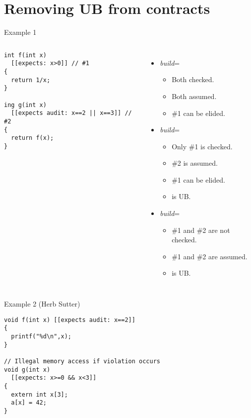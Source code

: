 \section{Removing UB from contracts}

\begin{frame}[t,fragile]{Example 1}
\vspace{-1em}
\begin{columns}[T]

\begin{block}{}
\begin{lstlisting}
int f(int x) 
  [[expects: x>0]] // #1
{
  return 1/x;
}

ing g(int x) 
  [[expects audit: x==2 || x==3]] // #2
{
  return f(x);
}
\end{lstlisting}
\end{block}

\begin{itemize}
  \item \emph{build}=
    \begin{itemize}
      \item Both checked.
      \item Both assumed.
      \item \#1 can be elided.
    \end{itemize}
  \pause\vfill
  \item \emph{build}=
    \begin{itemize}
      \item Only \#1 is checked.
      \item \#2 is assumed.
      \item \#1 can be elided.
      \item {} is UB.
    \end{itemize}
  \pause\vfill
  \item \emph{build}=
    \begin{itemize}
      \item \#1 and \#2 are not checked.
      \item \#1 and \#2 are assumed.
      \item {} is UB.
    \end{itemize}
\end{itemize}
\end{columns}
\end{frame}

\begin{frame}[t,fragile]{Example 2 (Herb Sutter)}
\begin{block}{}
\begin{lstlisting}
void f(int x) [[expects audit: x==2]]
{ 
  printf("%d\n",x); 
}

// Illegal memory access if violation occurs
void g(int x) 
  [[expects: x>=0 && x<3]]
{
  extern int x[3];
  a[x] = 42;
}
\end{lstlisting}
\end{block}
\end{frame}


